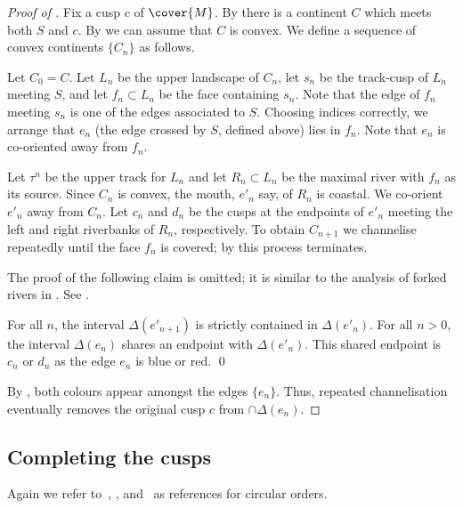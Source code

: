 \documentclass[12pt]{amsart}
\begin{document}
\begin{proof}[Proof of ]
Fix a cusp $c$ of $\cover{M}$.  By  there is a continent $C$ which meets both $S$ and $c$.  By  we can assume that $C$ is convex.  We define a sequence of convex continents $\{C_n\}$ as follows. 

Let $C_0 = C$.  Let $L_n$ be the upper landscape of $C_n$, let $s_n$ be the track-cusp of $L_n$ meeting $S$, and let $f_n \subset L_n$ be the face containing $s_n$.  Note that the edge of $f_n$ meeting $s_n$ is one of the edges associated to $S$.  Choosing indices correctly, we arrange that $e_n$ (the edge crossed by $S$, defined above) lies in $f_n$.  Note that $e_n$ is co-oriented away from $f_n$.  

Let $\tau^n$ be the upper track for $L_n$ and let $R_n \subset L_n$ be the maximal river with $f_n$ as its source.  Since $C_n$ is convex, the mouth, $e'_n$ say, of $R_n$ is coastal.  We co-orient $e'_n$ away from $C_n$.   Let $c_n$ and $d_n$ be the cusps at the endpoints of $e'_n$ meeting the left and right riverbanks of $R_n$, respectively.  To obtain $C_{n+1}$ we channelise repeatedly until the face $f_n$ is covered; by  this process terminates.

The proof of the following claim is omitted; it is similar to the analysis of forked rivers in .  See .  


\begin{claim*}
For all $n$, the interval $\Delta(e'_{n+1})$ is strictly contained in $\Delta(e'_n)$.  For all $n > 0$, the interval $\Delta(e_{n})$ shares an endpoint with $\Delta(e'_n)$.  This shared endpoint is $c_n$ or $d_n$ as the edge $e_n$ is blue or red. \qed
\end{claim*}

By , both colours appear amongst the edges $\{e_n\}$. Thus, repeated channelisation eventually removes the original cusp $c$ from $\cap \Delta(e_n)$.  
\end{proof} 

\subsection{Completing the cusps}
\label{Sec:BuildingVeeringCircle}
Again we refer to~\cite[Section~2]{Thurston98}, \cite[Section~2.6]{Calegari07}, and~\cite[Chapter~3]{Frankel13} as references for circular orders. 
\end{document}
